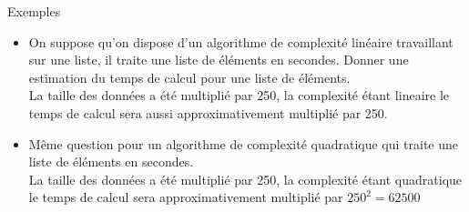 \documentclass[10pt]{beamer}
\begin{document}
\begin{frame}[fragile]{\Ctitle}{\stitle}
	\begin{exampleblock}{Exemples}
		\begin{itemize}
			\item<1-> On suppose qu'on dispose d'un algorithme de complexité linéaire travaillant sur une liste, il traite une liste de  éléments en  secondes. Donner une estimation du temps de calcul pour une liste de  éléments.\\
				\onslide<2-> {\textcolor{OliveGreen}{La taille des données a été multiplié par 250, la complexité étant lineaire le temps de calcul sera aussi approximativement multiplié par 250. \\}}
				\onslide<3->{\textcolor{OliveGreen}{$0.015 \times 250 = 3.75$, on peut donc prévoir un temps de calcul d'environ 3,75 secondes}}
			\item<4-> Même question pour un algorithme de complexité quadratique qui traite une liste de  éléments en  secondes.\\
				\onslide<5-> {\textcolor{OliveGreen}{La taille des données a été multiplié par 250, la complexité étant quadratique le temps de calcul sera  approximativement multiplié par $250^2=62500$ \\}}
				\onslide<6->{\textcolor{OliveGreen}{$0.07 \times 62\,500 = 4375$, on peut donc prévoir un temps de calcul d'environ $4\,375$ secondes, c'est à dire près d'une heure et 15 minutes !}}
		\end{itemize}
	\end{exampleblock}
\end{frame}
\end{document}
